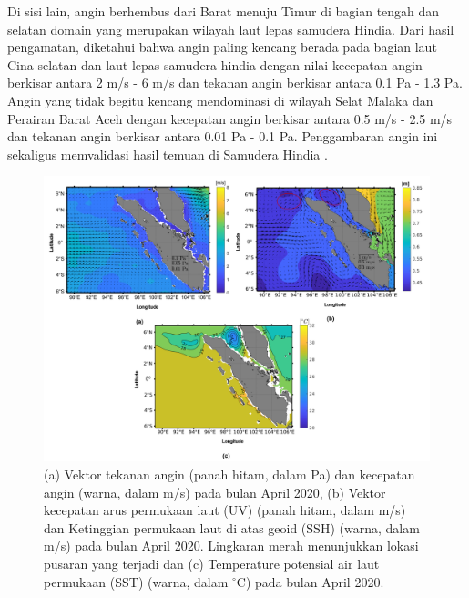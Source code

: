 \begin{spacing}{1.5}
	Di sisi lain, angin berhembus dari Barat menuju Timur di bagian tengah dan selatan domain yang merupakan wilayah laut lepas samudera Hindia. Dari hasil pengamatan, diketahui bahwa angin paling kencang berada pada bagian laut Cina selatan dan laut lepas samudera hindia dengan nilai kecepatan angin berkisar antara 2 m/s - 6 m/s dan tekanan angin berkisar antara 0.1 Pa - 1.3 Pa. Angin yang tidak begitu kencang mendominasi di wilayah Selat Malaka dan Perairan Barat Aceh dengan kecepatan angin berkisar antara 0.5 m/s - 2.5 m/s dan tekanan angin berkisar antara 0.01 Pa - 0.1 Pa. Penggambaran angin ini sekaligus memvalidasi hasil temuan di Samudera Hindia .
	
	\begin{figure}[H]
		\centering
		\includegraphics[width=15cm]{contents/final_figure_paper2/gambar_1}
		\caption{(a) Vektor tekanan angin (panah hitam, dalam Pa) dan kecepatan angin (warna, dalam m/s) pada bulan April 2020, (b) Vektor kecepatan arus permukaan laut (UV) (panah hitam, dalam m/s) dan Ketinggian permukaan laut di atas geoid (SSH) (warna, dalam m/s) pada bulan April 2020. Lingkaran merah menunjukkan lokasi pusaran yang terjadi dan (c) Temperature potensial air laut permukaan (SST) (warna, dalam $^\circ$C) pada bulan April 2020.}
		\label{fig:paper2_1}
	\end{figure}
	

\end{spacing}
